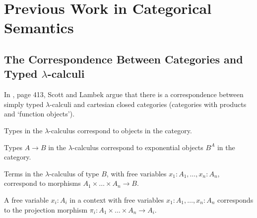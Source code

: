 \chapter{Previous Work in Categorical Semantics}\label{ch:previous-work}


\section{The Correspondence Between Categories and Typed \texorpdfstring{$ \lambda $}{lambda}-calculi}\label{sec:lambek-correspondence}
In \autocite{curry}, page 413, Scott and Lambek argue that there is a correspondence between simply typed $ \lambda $-calculi and cartesian closed categories (categories with products and `function objects').

Types in the $ \lambda $-calculus correspond to objects in the category.

Types $ A \to B $ in the $ \lambda $-calculus correspond to exponential objects $ B^A $ in the category.

Terms in the $ \lambda $-calculus of type $ B $, with free variables $ x_1: A_1, \dots, x_n: A_n $, correspond to morphisms $ A_1 \times \dots \times A_n \to B $.

A free variable $ x_i: A_i $ in a context with free variables $ x_1: A_1, \dots, x_n: A_n $ corresponds to the projection morphism $ \pi_i : A_1 \times \dots \times A_n \to A_i $.

